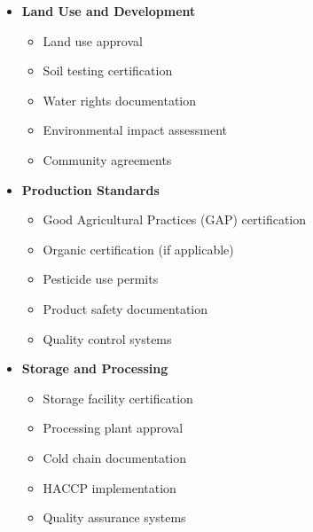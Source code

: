 \begin{tcolorbox}[
    colback=white,
    colframe=primarydark,
    title=\textbf{Agricultural Sector Requirements},
    before skip=1em,
    after skip=1em
]
    \begin{itemize}[leftmargin=*,itemsep=0.5em]
        \item \textbf{Land Use and Development}
        \begin{itemize}[itemsep=0.3em]
            \item Land use approval
            \item Soil testing certification
            \item Water rights documentation
            \item Environmental impact assessment
            \item Community agreements
        \end{itemize}

        \vspace{0.5em}

        \item \textbf{Production Standards}
        \begin{itemize}[itemsep=0.3em]
            \item Good Agricultural Practices (GAP) certification
            \item Organic certification (if applicable)
            \item Pesticide use permits
            \item Product safety documentation
            \item Quality control systems
        \end{itemize}

        \vspace{0.5em}

        \item \textbf{Storage and Processing}
        \begin{itemize}[itemsep=0.3em]
            \item Storage facility certification
            \item Processing plant approval
            \item Cold chain documentation
            \item HACCP implementation
            \item Quality assurance systems
        \end{itemize}
    \end{itemize}
\end{tcolorbox}

